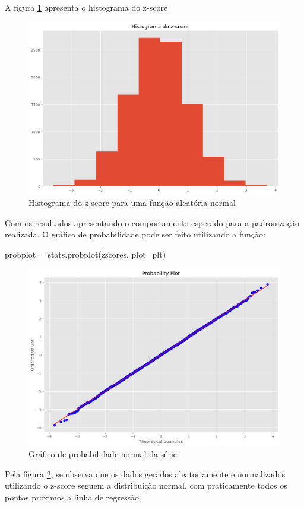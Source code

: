 \documentclass[12pt,a4paper,portuguese]{article}
\begin{document}
A figura \ref{fig:lista1-3} apresenta o histograma do z-score
\begin{figure}[H]
	\centering
	\includegraphics[width=0.9\linewidth]{lista1-3.2c}
	\caption{Histograma do z-score para uma função aleatória normal}
\label{fig:lista1-3}
\end{figure}
Com os resultados apresentando o comportamento esperado para a padronização realizada. O gráfico de probabilidade pode ser feito utilizando a função:
\begin{python}
probplot = stats.probplot(zscores, plot=plt)
\end{python}
	
\begin{figure}[H]
	\centering
	\includegraphics[width=0.9\linewidth]{lista1-3.2d}
	\caption{Gráfico de probabilidade normal da série}
	\label{lista1-3.2d}
\end{figure}
Pela figura \ref{lista1-3.2d}, se observa que os dados gerados aleatoriamente e normalizados utilizando o z-score seguem a distribuição normal, com praticamente todos os pontos próximos a linha de regressão. \\
\end{document}
